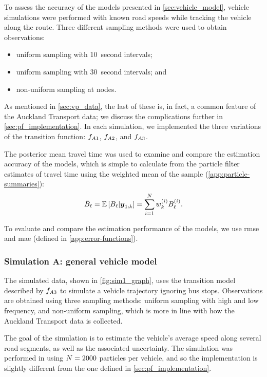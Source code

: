 To assess the accuracy of the models presented in \cref{sec:vehicle_model}, vehicle simulations were performed with known road speeds while tracking the vehicle along the route. Three different sampling methods were used to obtain observations:
\begin{itemize}
\item uniform sampling with 10~second intervals;
\item uniform sampling with 30~second intervals; and
\item non-uniform sampling at nodes.
\end{itemize}
As mentioned in \cref{sec:vp_data}, the last of these is, in fact, a common feature of the Auckland Transport data; we discuss the complications further in \cref{sec:pf_implementation}. In each simulation, we implemented the three variations of the transition function: $f_{A1}$, $f_{A2}$, and $f_{A3}$.


The posterior mean travel time was used to examine and compare the estimation accuracy of the models, which is simple to calculate from the particle filter estimates of travel time using the weighted mean of the sample (\cref{app:particle-summaries}):
\begin{equation}
\label{eq:pf_travel_time_mean}
\bar{B}_\ell =
\mathbb{E}\left[B_\ell | \boldsymbol{y}_{1:k}\right] =
\sum_{i=1}^N w^{(i)}_k B^{(i)}_\ell.
\end{equation}


To evaluate and compare the estimation performance of the models, we use \gls{rmse} and \gls{mae} (defined in \cref{app:error-functions}).


\subsubsection{Simulation A: general vehicle model}
\label{sec:vehicle_sim_A}





The simulated data, shown in \cref{fig:sim1_graph}, uses the transition model described by $f_{A3}$ to simulate a vehicle trajectory ignoring bus stops. Observations are obtained using three sampling methods: uniform sampling with high and low frequency, and non-uniform sampling, which is more in line with how the Auckland Transport data is collected.


The goal of the simulation is to estimate the vehicle's average speed along several road segments, as well as the associated uncertainty. The simulation was performed in \Rstats{} \citep{rcore} using $N = 2000$ particles per vehicle, and so the implementation is slightly different from the \Cpp{} one defined in \cref{sec:pf_implementation}.


